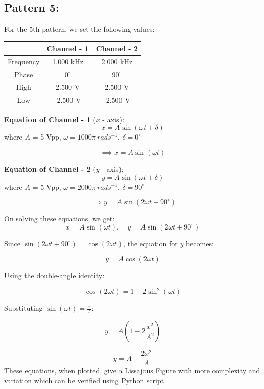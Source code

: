 \documentclass[12pt]{article}
\begin{document}
\subsection{Pattern 5:}
For the 5th pattern, we set the following values:
\begin{table}[H]
    \centering
    \begin{tabular}{|c|c|c|}
    \hline
        & \textbf{Channel - 1} & \textbf{Channel - 2}\\
    \hline
    Frequency & 1.000 kHz & 2.000 kHz\\
    \hline
    Phase     & $0^{\circ}$ & $90^{\circ}$\\
    \hline
    High      & 2.500 V & 2.500 V\\
    \hline
    Low       & -2.500 V & -2.500 V\\
    \hline
    \end{tabular}
\end{table}

\textbf{Equation of Channel - 1} ($x$ - axis):
\[
x = A \sin{\left(\omega t + \delta\right)}
\]
where $A$ = 5 Vpp, $\omega = 1000 \pi \, rad s^{-1}$, $\delta = 0^{\circ}$

\[
\implies x = A \sin{\left(\omega t\right)}
\]

\textbf{Equation of Channel - 2} ($y$ - axis):
\[
y = A \sin{\left(\omega t + \delta\right)}
\]
where $A$ = 5 Vpp, $\omega = 2000 \pi \, rad s^{-1}$, $\delta = 90^{\circ}$

\[
\implies y = A \sin{\left(2 \omega t + 90^\circ\right)}
\]

On solving these equations, we get:
\[
x = A \sin{\left(\omega t\right)}, \quad y = A \sin{\left(2 \omega t + 90^\circ\right)}
\]

Since \( \sin(2\omega t + 90^\circ) = \cos(2\omega t) \), the equation for \( y \) becomes:

\[
y = A \cos(2\omega t)
\]

Using the double-angle identity:

\[
\cos(2\omega t) = 1 - 2\sin^2(\omega t)
\]

Substituting \( \sin(\omega t) = \frac{x}{A} \):

\[
y = A \left(1 - 2 \frac{x^2}{A^2}\right)
\]

\[
y = A - \frac{2x^2}{A}
\]
These equations, when plotted, give a Lissajous Figure with more complexity and variation which can be verified using Python script
\end{document}
